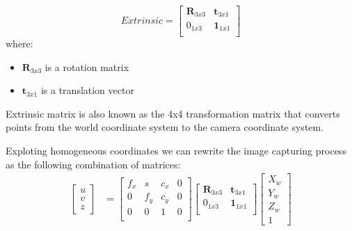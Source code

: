 \[
  Extrinsic= \begin{bmatrix}
    \textbf{R}_{3x3} & \textbf{t}_{3x1}  \\
    0_{1x3} & \textbf{1}_{1x1}  \\
  \end{bmatrix}
\]
where:
\begin{itemize}
    \item $\textbf{R}_{3x3}$ is a rotation matrix
    \item $\textbf{t}_{3x1}$ is a translation vector
\end{itemize}
Extrinsic matrix is also known as the 4x4 transformation matrix 
that converts points from the world coordinate system to the camera
coordinate system.

Exploting homogeneous coordinates we can rewrite the image capturing process as the 
following combination of matrices:
\begin{align*}
    \begin{bmatrix}
        u \\
        v \\
        z
      \end{bmatrix}
    &= \begin{bmatrix}
        f_{x} & s & c_{x} & 0 \\
        0 & f_{y} & c_{y} & 0\\
        0 & 0     & 1     & 0\\
      \end{bmatrix} \begin{bmatrix}
        \textbf{R}_{3x3} & \textbf{t}_{3x1}  \\
        0_{1x3} & \textbf{1}_{1x1}  \\
      \end{bmatrix}
      \begin{bmatrix}
        X_w \\
        Y_w \\
        Z_w \\
        1    
      \end{bmatrix}
  \end{align*}




